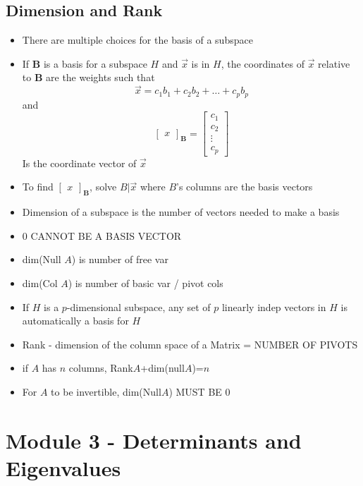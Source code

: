 \documentclass{article}
\begin{document}
\subsection{Dimension and Rank}
\begin{itemize}
    \item There are multiple choices for the basis of a subspace 
    \item If \(\textbf{B}\) is a basis for a subspace \(H\) and \(\vec{x}\) is in \(H\), the coordinates of \(\vec{x}\) relative to \(\textbf{B}\) are the weights such that 
    \[\vec{x}=c_1b_1+c_2b_2+\dots+c_pb_p\] and \[\begin{bmatrix}x\end{bmatrix}_{\textbf{B}} = \begin{bmatrix}c_1\\c_2\\\vdots\\c_p\end{bmatrix}\]
    Is the coordinate vector of \(\vec{x}\)
    \item To find \(\begin{bmatrix}x\end{bmatrix}_{\textbf{B}}\), solve \(B|\vec{x}\) where \(B\)'s columns are the basis vectors
    \item Dimension of a subspace is the number of vectors needed to make a basis 
    \item 0 CANNOT BE A BASIS VECTOR 
    \item dim(Null \(A\)) is number of free var 
    \item dim(Col \(A\)) is number of basic var / pivot cols 
    \item If \(H\) is a \(p\)-dimensional subspace, any set of \(p\) linearly indep vectors in \(H\) is automatically a basis for \(H\)
    \item Rank - dimension of the column space of a Matrix = NUMBER OF PIVOTS
    \item if \(A\) has \(n\) columns, Rank\(A\)+dim(null\(A\))=\(n\)
    \item For \(A\) to be invertible, dim(Null\(A\)) MUST BE 0
\end{itemize}

\section{Module 3 - Determinants and Eigenvalues}
\end{document}

